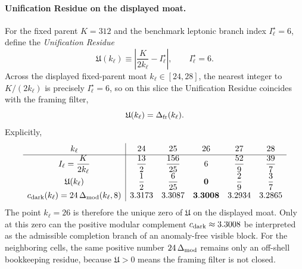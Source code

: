 \documentclass[11pt]{article}
\begin{document}
\paragraph{Unification Residue on the displayed moat.}
For the fixed parent $K=312$ and the benchmark leptonic branch index
$I_{\ell}^{\star}=6$, define the \emph{Unification Residue}
\begin{equation}
\label{eq:supp-unification-residue}
 \mathfrak U(k_{\ell})
 \equiv
 \left|\frac{K}{2k_{\ell}}-I_{\ell}^{\star}\right|,
 \qquad
 I_{\ell}^{\star}=6.
\end{equation}
Across the displayed fixed-parent moat $k_{\ell}\in[24,28]$, the nearest
integer to $K/(2k_{\ell})$ is precisely $I_{\ell}^{\star}=6$, so on this slice
the Unification Residue coincides with the framing filter,
\begin{equation}
 \mathfrak U(k_{\ell})=\Delta_{\rm fr}(k_{\ell}).
\end{equation}
Explicitly,
\begin{equation}
\renewcommand{\arraystretch}{1.15}
\begin{array}{c|ccccc}
 k_{\ell} & 24 & 25 & 26 & 27 & 28 \\
\hline
 I_{\ell}=\dfrac{K}{2k_{\ell}} & \dfrac{13}{2} & \dfrac{156}{25} & 6 & \dfrac{52}{9} & \dfrac{39}{7} \\
 \mathfrak U(k_{\ell}) & \dfrac{1}{2} & \dfrac{6}{25} & \mathbf{0} & \dfrac{2}{9} & \dfrac{3}{7} \\
 c_{\rm dark}(k_{\ell})=24\,\Delta_{\rm mod}(k_{\ell},8) & 3.3173 & 3.3087 & \mathbf{3.3008} & 3.2934 & 3.2865
\end{array}
\end{equation}
The point $k_{\ell}=26$ is therefore the unique zero of $\mathfrak U$ on the
displayed moat. Only at this zero can the positive modular complement
$c_{\rm dark}\approx3.3008$ be interpreted as the admissible completion branch
of an anomaly-free visible block. For the neighboring cells, the same positive
number $24\,\Delta_{\rm mod}$ remains only an off-shell bookkeeping residue,
because $\mathfrak U>0$ means the framing filter is not closed.
\end{document}
